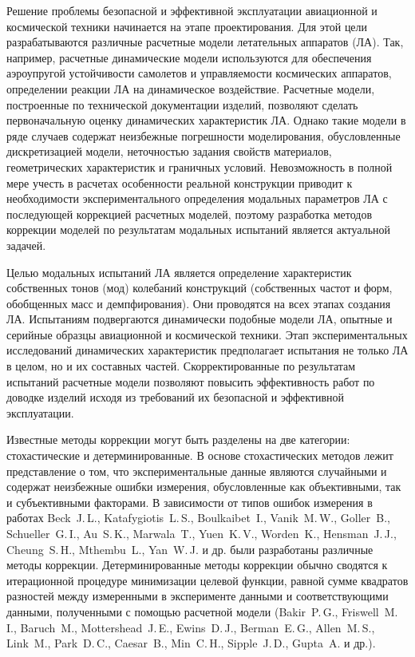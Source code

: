 
\par\null\par

{\actuality} 

Решение проблемы безопасной и эффективной эксплуатации авиационной и космической техники начинается на этапе проектирования. Для этой цели разрабатываются различные расчетные модели летательных аппаратов (ЛА). Так, например, расчетные динамические модели используются для обеспечения аэроупругой устойчивости самолетов и управляемости космических аппаратов, определении реакции ЛА на динамическое воздействие. Расчетные модели, построенные по технической документации изделий, позволяют сделать первоначальную оценку динамических характеристик ЛА. Однако такие модели в ряде случаев содержат неизбежные погрешности моделирования, обусловленные дискретизацией модели, неточностью задания свойств материалов, геометрических характеристик и граничных условий. Невозможность в полной мере учесть в расчетах особенности реальной конструкции приводит к необходимости экспериментального определения модальных параметров ЛА с последующей коррекцией расчетных моделей, поэтому разработка методов коррекции моделей по результатам модальных испытаний является актуальной задачей.

Целью модальных испытаний ЛА является определение характеристик собственных тонов (мод) колебаний конструкций (собственных частот и форм, обобщенных масс и демпфирования). Они проводятся на всех этапах создания ЛА. Испытаниям подвергаются динамически подобные модели ЛА, опытные и серийные образцы авиационной и космической техники. Этап экспериментальных исследований динамических характеристик предполагает испытания не только ЛА в целом, но и их составных частей. Скорректированные по результатам испытаний расчетные модели позволяют повысить эффективность работ по доводке изделий исходя из требований их безопасной и эффективной эксплуатации. 

{\progress}

Известные методы коррекции могут быть разделены на две категории: стохастические и детерминированные. В основе стохастических методов лежит представление о том, что экспериментальные данные являются случайными и содержат неизбежные ошибки измерения, обусловленные как объективными, так и субъективными факторами. В зависимости от типов ошибок измерения в работах Beck~J.\,L., Katafygiotis~L.\,S., Boulkaibet~I., Vanik~M.\,W., Goller~B., Schueller~G.\,I., Au~S.\,K., Marwala~T., Yuen~K.\,V., Worden~K., Hensman~J.\,J., Cheung~S.\,H., Mthembu~L., Yan~W.\,J. и др. были разработаны различные методы коррекции. Детерминированные методы коррекции обычно сводятся к итерационной процедуре минимизации целевой функции, равной сумме квадратов разностей между измеренными в эксперименте данными и соответствующими данными, полученными с помощью расчетной модели (Bakir~P.\,G., Friswell~M.\,I., Baruch~M., Mottershead~J.\,E., Ewins~D.\,J., Berman~E.\,G., Allen~M.\,S., Link~M., Park~D.\,C., Caesar~B., Min~C.\,H., Sipple~J.\,D., Gupta~A. и др.).

